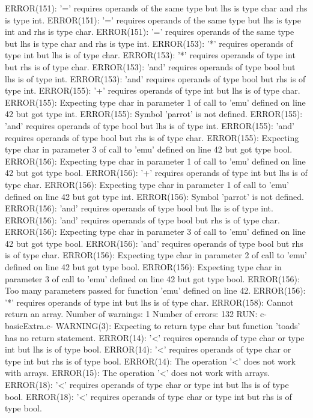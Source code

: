 \documentclass[12pt]{book}
\begin{document}
ERROR(151): '=' requires operands of the same type but lhs is type char and rhs is type int.
ERROR(151): '=' requires operands of the same type but lhs is type int and rhs is type char.
ERROR(151): '=' requires operands of the same type but lhs is type char and rhs is type int.
ERROR(153): '*' requires operands of type int but lhs is of type char.
ERROR(153): '*' requires operands of type int but rhs is of type char.
ERROR(153): 'and' requires operands of type bool but lhs is of type int.
ERROR(153): 'and' requires operands of type bool but rhs is of type int.
ERROR(155): '+' requires operands of type int but lhs is of type char.
ERROR(155): Expecting type char in parameter 1 of call to 'emu' defined on line 42 but got type int.
ERROR(155): Symbol 'parrot' is not defined.
ERROR(155): 'and' requires operands of type bool but lhs is of type int.
ERROR(155): 'and' requires operands of type bool but rhs is of type char.
ERROR(155): Expecting type char in parameter 3 of call to 'emu' defined on line 42 but got type bool.
ERROR(156): Expecting type char in parameter 1 of call to 'emu' defined on line 42 but got type bool.
ERROR(156): '+' requires operands of type int but lhs is of type char.
ERROR(156): Expecting type char in parameter 1 of call to 'emu' defined on line 42 but got type int.
ERROR(156): Symbol 'parrot' is not defined.
ERROR(156): 'and' requires operands of type bool but lhs is of type int.
ERROR(156): 'and' requires operands of type bool but rhs is of type char.
ERROR(156): Expecting type char in parameter 3 of call to 'emu' defined on line 42 but got type bool.
ERROR(156): 'and' requires operands of type bool but rhs is of type char.
ERROR(156): Expecting type char in parameter 2 of call to 'emu' defined on line 42 but got type bool.
ERROR(156): Expecting type char in parameter 3 of call to 'emu' defined on line 42 but got type bool.
ERROR(156): Too many parameters passed for function 'emu' defined on line 42.
ERROR(156): '*' requires operands of type int but lhs is of type char.
ERROR(158): Cannot return an array.
Number of warnings: 1
Number of errors: 132
RUN: c- basicExtra.c-
WARNING(3): Expecting to return type char but function 'toads' has no return statement.
ERROR(14): '<' requires operands of type char or type int but lhs is of type bool.
ERROR(14): '<' requires operands of type char or type int but rhs is of type bool.
ERROR(14): The operation '<' does not work with arrays.
ERROR(15): The operation '<' does not work with arrays.
ERROR(18): '<' requires operands of type char or type int but lhs is of type bool.
ERROR(18): '<' requires operands of type char or type int but rhs is of type bool.
\end{document}
